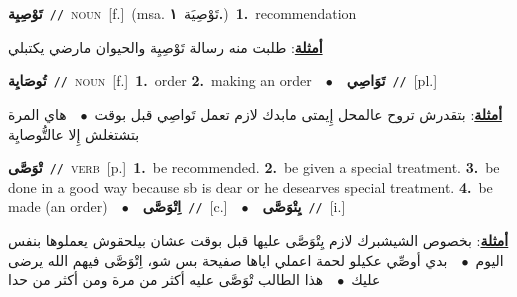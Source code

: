 \documentclass[10pt,a4paper,twoside]{article} %
\begin{document}
\begin{multicols}{2}
{\setlength\topsep{0pt}\textbf{\foreignlanguage{arabic}{تَوْصِيِة}}\ {\color{gray}\texttt{//}\color{black}}\ \textsc{noun}\ [f.]\ \color{gray}(msa. \foreignlanguage{arabic}{تَوْصِيَة}~\foreignlanguage{arabic}{\textbf{١.}})\color{black}\ \textbf{1.}~recommendation\  \begin{flushright}\color{gray}\foreignlanguage{arabic}{\textbf{\underline{\foreignlanguage{arabic}{أمثلة}}}: طلبت منه رسالة تَوْصِيِة والحيوان مارضي يكتبلي}\end{flushright}\color{black}} \vspace{2mm}

{\setlength\topsep{0pt}\textbf{\foreignlanguage{arabic}{تُوصَايِة}}\ {\color{gray}\texttt{//}\color{black}}\ \textsc{noun}\ [f.]\ \textbf{1.}~order  \textbf{2.}~making an order\ \ $\bullet$\ \ \setlength\topsep{0pt}\textbf{\foreignlanguage{arabic}{تَوَاصِي}}\ {\color{gray}\texttt{//}\color{black}}\ [pl.]\  \begin{flushright}\color{gray}\foreignlanguage{arabic}{\textbf{\underline{\foreignlanguage{arabic}{أمثلة}}}: بتقدرش تروح عالمحل إِيمتى مابدك لازم تعمل تَواصِي قبل بوقت\ $\bullet$\ \  هاي المرة بتشتغلش إِلا عالتُّوصايِة}\end{flushright}\color{black}} \vspace{2mm}

{\setlength\topsep{0pt}\textbf{\foreignlanguage{arabic}{تْوَصَّى}}\ {\color{gray}\texttt{//}\color{black}}\ \textsc{verb}\ [p.]\ \textbf{1.}~be recommended.  \textbf{2.}~be given a special treatment.  \textbf{3.}~be done in a good way because sb is dear or he desearves special treatment.  \textbf{4.}~be made (an order)\ \ $\bullet$\ \ \setlength\topsep{0pt}\textbf{\foreignlanguage{arabic}{اِتْوَصَّى}}\ {\color{gray}\texttt{//}\color{black}}\ [c.]\ \ $\bullet$\ \ \setlength\topsep{0pt}\textbf{\foreignlanguage{arabic}{يِتْوَصَّى}}\ {\color{gray}\texttt{//}\color{black}}\ [i.]\  \begin{flushright}\color{gray}\foreignlanguage{arabic}{\textbf{\underline{\foreignlanguage{arabic}{أمثلة}}}: بخصوص الشيشبرك لازم يِتْوَصَّى عليها قبل بوقت عشان بيلحقوش يعملوها بنفس اليوم\ $\bullet$\ \  بدي أوصِّي عكيلو لحمة اعملي اياها صفيحة بس شو، اِتْوَصَّى فيهم الله يرضى عليك\ $\bullet$\ \  هذا الطالب تْوَصَّى عليه أكثر من مرة ومن أكثر من حدا}\end{flushright}\color{black}} \vspace{2mm}


\end{multicols}
\end{document}
